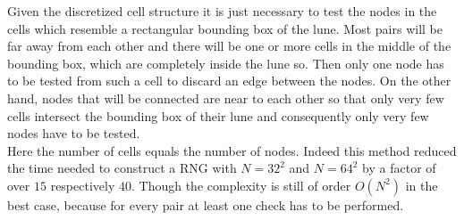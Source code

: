         Given the discretized cell structure it is just necessary to test the nodes in the cells which
        resemble a rectangular bounding box of the lune. Most pairs will be
        far away from each other and there will be one or more cells in the
        middle of the bounding box, which are completely inside the lune so.
        Then only one node has to be tested from such a cell to discard an
        edge between the nodes. On the other hand, nodes that will be connected
        are near to each other so that only very few cells intersect the bounding
        box of their lune and consequently only very few nodes have to be tested.\\
        Here the number of cells equals the number of nodes.
        Indeed this method reduced the time needed to construct a RNG with
        \(N=32^2\) and \(N=64^2\) by a factor of
        over \(15\) respectively \(40\). Though the complexity is still of
        order \(O(N^2)\) in the best case, because for every pair at least
        one check has to be performed.
